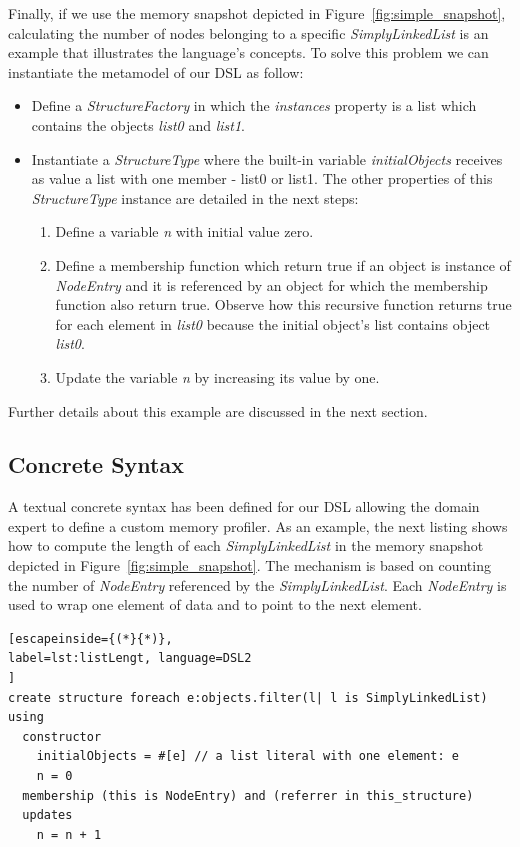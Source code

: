 Finally, if we use the memory snapshot depicted in Figure~\ref{fig:simple_snapshot}, calculating the number of nodes belonging to a specific \textit{SimplyLinkedList} is an example that illustrates the language's concepts.
To solve this problem we can instantiate the metamodel of our DSL as follow:
\begin{itemize}
\item Define a \textit{StructureFactory} in which the \textit{instances} property is a list which contains the objects \textit{list0} and \textit{list1}.
\item Instantiate a \textit{StructureType} where the built-in variable \textit{initialObjects} receives as value a list with one member - list0 or list1.
      The other properties of this \textit{StructureType} instance are detailed in the next steps: 
      \begin{enumerate}
      \item Define a variable \textit{n} with initial value zero.
      \item Define a membership function which return true if an object is instance of \textit{NodeEntry} and it is referenced by an object for which the membership function also return true. Observe how this recursive function returns true for each element in \textit{list0} because the initial object's list contains object \textit{list0}. 
      \item Update the variable \textit{n} by increasing its value by one.
      \end{enumerate}  
\end{itemize}
Further details about this example are discussed in the next section.

\subsection{Concrete Syntax}\label{sec:concrete-syntax}

A textual concrete syntax has been defined for our DSL allowing the domain expert to define a custom memory profiler.
As an example, the next listing shows how to compute the length of each \textit{SimplyLinkedList} in the memory snapshot depicted in Figure~\ref{fig:simple_snapshot}.
The mechanism is based on counting the number of \textit{NodeEntry} referenced by the \textit{SimplyLinkedList}.
Each \textit{NodeEntry} is used to wrap one element of data and to point to the next element.

\begin{lstlisting}[escapeinside={(*}{*)}, 
label=lst:listLengt, language=DSL2
]
create structure foreach e:objects.filter(l| l is SimplyLinkedList) using
  constructor
    initialObjects = #[e] // a list literal with one element: e
    n = 0
  membership (this is NodeEntry) and (referrer in this_structure)
  updates 
    n = n + 1
\end{lstlisting}

